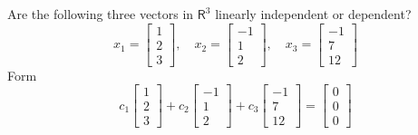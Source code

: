 \documentclass[../main.tex]{subfiles}
\begin{document}
\begin{example} Are the following three vectors in $\mathsf{R}^{3}$ linearly independent or dependent?
$$
x_{1}=\left[\begin{array}{l}
1 \\
2 \\
3
\end{array}\right], \quad x_{2}=\left[\begin{array}{c}
-1 \\
1 \\
2
\end{array}\right], \quad x_{3}=\left[\begin{array}{c}
-1 \\
7 \\
12
\end{array}\right]
$$
Form
$$
c_{1}\left[\begin{array}{l}
1 \\
2 \\
3
\end{array}\right]+c_{2}\left[\begin{array}{c}
-1 \\
1 \\
2
\end{array}\right]+c_{3}\left[\begin{array}{c}
-1 \\
7 \\
12
\end{array}\right]=\left[\begin{array}{l}
0 \\
0 \\
0
\end{array}\right]
$$


\end{example}
\end{document}
